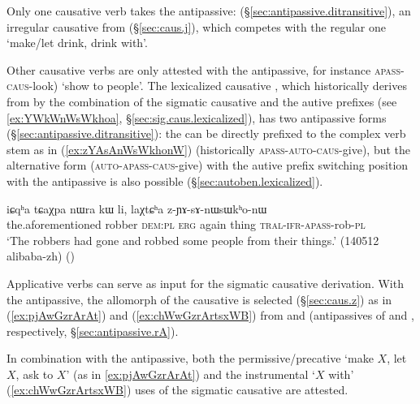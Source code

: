 Only one causative verb takes the  antipassive:   (§\ref{sec:antipassive.ditransitive}), an irregular causative from  (§\ref{sec:caus.j}), which competes with the regular one  `make/let drink, drink with'.

Other causative verbs are only attested with the  antipassive, for instance   \textsc{apass}-\textsc{caus}-look) `show to people'. The lexicalized causative  , which historically derives from  by the combination of the sigmatic causative  and the autive  prefixes (see \ref{ex:YWkWnWsWkhoa}, §\ref{sec:sig.caus.lexicalized}), has two  antipassive forms (§\ref{sec:antipassive.ditransitive}): the  can be directly prefixed to the complex verb stem as in  (\ref{ex:zYAsAnWsWkhonW}) (historically  \textsc{apass}-\textsc{auto}-\textsc{caus}-give), but the alternative form  (\textsc{auto}-\textsc{apass}-\textsc{caus}-give) with the autive prefix  switching position with the antipassive is also possible  (§\ref{sec:autoben.lexicalized}).
 
\begin{exe}
\ex  \label{ex:zYAsAnWsWkhonW}
\gll   iɕqʰa tɕaχpa nɯra kɯ li, laχtɕʰa z-ɲɤ-sɤ-nɯsɯkʰo-nɯ  \\
the.aforementioned robber \textsc{dem}:\textsc{pl} \textsc{erg} again thing \textsc{tral}-\textsc{ifr}-\textsc{apass}-rob-\textsc{pl}   \\
\glt `The robbers had gone and robbed some people from their things.' (140512 alibaba-zh) ()
\end{exe}  

Applicative verbs can serve as input for the sigmatic causative derivation. With the  antipassive, the  allomorph of the causative is selected (§\ref{sec:caus.z}) as in   (\ref{ex:pjAwGzrArAt}) and  (\ref{ex:chWwGzrArtsxWB})  from  and  (antipassives of  and , respectively, §\ref{sec:antipassive.rA}). 

In combination with the antipassive, both the permissive/precative `make $X$, let $X$, ask to $X$' (as in \ref{ex:pjAwGzrArAt}) and the instrumental `$X$ with' (\ref{ex:chWwGzrArtsxWB}) uses of the sigmatic causative are attested.

